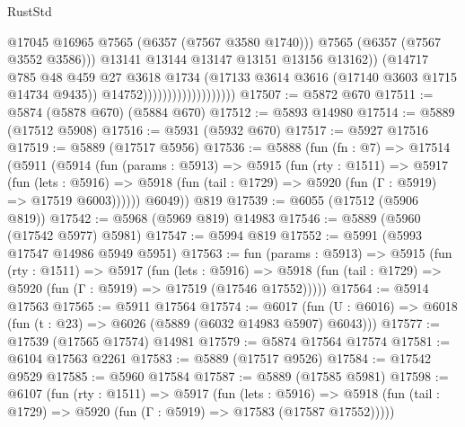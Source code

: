 \begin{lexlean}{RustStd}
\begin{coremodule}
                                                @17045
                                                @16965
                                                @7565
                                                (@6357 (@7567 @3580 @1740)))
                                              @7565
                                              (@6357 (@7567 @3552 @3586)))
                                            @13141
                                            @13144
                                            @13147
                                            @13151
                                            @13156
                                            @13162))
                                        (@14717
                                          @785
                                          @48
                                          @459
                                          @27
                                          @3618
                                          @1734
                                          (@17133 @3614 @3616 (@17140 @3603 @1715 @14734 @9435))
                                          @14752)))))))))))))))))))
@17507 := @5872 @670
@17511 := @5874 (@5878 @670) (@5884 @670)
@17512 := @5893 @14980
@17514 := @5889 (@17512 @5908)
@17516 := @5931 (@5932 @670)
@17517 := @5927 @17516
@17519 := @5889 (@17517 @5956)
@17536 := @5888
    (fun (fn : @7) =>
    @17514
      (@5911
        (@5914
          (fun (params : @5913) =>
          @5915
            (fun (rty : @1511) =>
            @5917
              (fun (lets : @5916) =>
              @5918 (fun (tail : @1729) => @5920 (fun (Γ : @5919) => @17519 @6003))))))
        @6049))
    @819
@17539 := @6055 (@17512 (@5906 @819))
@17542 := @5968 (@5969 @819) @14983
@17546 := @5889 (@5960 (@17542 @5977) @5981)
@17547 := @5994 @819
@17552 := @5991 (@5993 @17547 @14986 @5949 @5951)
@17563 := fun (params : @5913) =>
  @5915
    (fun (rty : @1511) =>
    @5917
      (fun (lets : @5916) =>
      @5918 (fun (tail : @1729) => @5920 (fun (Γ : @5919) => @17519 (@17546 @17552)))))
@17564 := @5914 @17563
@17565 := @5911 @17564
@17574 := @6017
    (fun (U : @6016) => @6018 (fun (t : @23) => @6026 (@5889 (@6032 @14983 @5907) @6043)))
@17577 := @17539 (@17565 @17574) @14981
@17579 := @5874 @17564 @17574
@17581 := @6104 @17563 @2261
@17583 := @5889 (@17517 @9526)
@17584 := @17542 @9529
@17585 := @5960 @17584
@17587 := @5889 (@17585 @5981)
@17598 := @6107
    (fun (rty : @1511) =>
    @5917
      (fun (lets : @5916) =>
      @5918 (fun (tail : @1729) => @5920 (fun (Γ : @5919) => @17583 (@17587 @17552)))))

\end{coremodule}
\end{lexlean}
